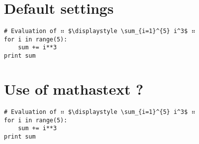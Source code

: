 \documentclass{article}
\begin{document}
\lstset{escapechar=\⠶}  


\section{Default settings}

\begin{lstlisting}
# Evaluation of ⠶ $\displaystyle \sum_{i=1}^{5} i^3$ ⠶
for i in range(5):
    sum += i**3
print sum
\end{lstlisting}


\section{Use of mathastext ?}

\begin{lstlisting}
# Evaluation of ⠶ $\displaystyle \sum_{i=1}^{5} i^3$ ⠶
for i in range(5):
    sum += i**3
print sum
\end{lstlisting}
\end{document}
